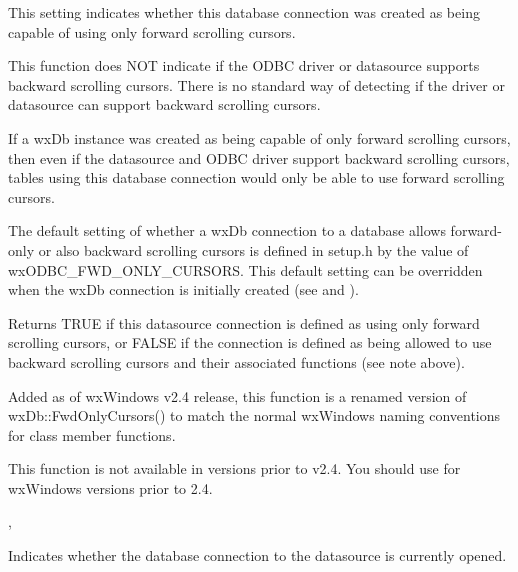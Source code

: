 \label{wxdbisfwdonlycursors}


This setting indicates whether this database connection was created
as being capable of using only forward scrolling cursors.  

This function does NOT indicate if the ODBC driver or datasource supports 
backward scrolling cursors.  There is no standard way of detecting if the 
driver or datasource can support backward scrolling cursors.

If a wxDb instance was created as being capable of only forward scrolling 
cursors, then even if the datasource and ODBC driver support backward 
scrolling cursors, tables using this database connection would only be able 
to use forward scrolling cursors.

The default setting of whether a wxDb connection to a database allows
forward-only or also backward scrolling cursors is defined in setup.h by the 
value of wxODBC_FWD_ONLY_CURSORS.  This default setting can be overridden
when the wxDb connection is initially created (see 
 and ).


Returns TRUE if this datasource connection is defined as using only forward
scrolling cursors, or FALSE if the connection is defined as being allowed to 
use backward scrolling cursors and their associated functions (see note above).


Added as of wxWindows v2.4 release, this function is a renamed version of 
wxDb::FwdOnlyCursors() to match the normal wxWindows naming conventions for 
class member functions.

This function is not available in versions prior to v2.4.  You should 
use  for wxWindows 
versions prior to 2.4.


, 


\label{wxdbisopen}


Indicates whether the database connection to the datasource is currently 
opened.


